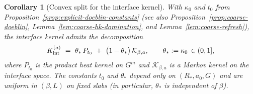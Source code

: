 \documentclass[11pt]{amsart}
\theoremstyle{plain}
\newtheorem{corollary}[theorem]{Corollary}
\theoremstyle{definition}
\theoremstyle{remark}
\begin{document}
\begin{corollary}[Convex split for the interface kernel]\label{cor:convex-split-interface}
With $\kappa_0$ and $t_0$ from Proposition~\ref{prop:explicit-doeblin-constants} (see also Proposition~\ref{prop:coarse-doeblin}, Lemma~\ref{lem:coarse-hk-domination}, and Lemma~\ref{lem:coarse-refresh}), the interface kernel admits the decomposition
\[
  K_{\rm int}^{(a)}\ =\ \theta_*\,P_{t_0}\ +\ \big(1-\theta_*\big)\,\mathcal K_{\beta,a},\qquad \theta_*:=\kappa_0\,\in(0,1],
\]
where $P_{t_0}$ is the product heat kernel on $G^m$ and $\mathcal K_{\beta,a}$ is a Markov kernel on the interface space. The constants $t_0$ and $\theta_*$ depend only on $(R_*,a_0,G)$ and are uniform in $(\beta,L)$ on fixed slabs (in particular, $\theta_*$ is independent of $\beta$).
\end{corollary}
\end{document}
